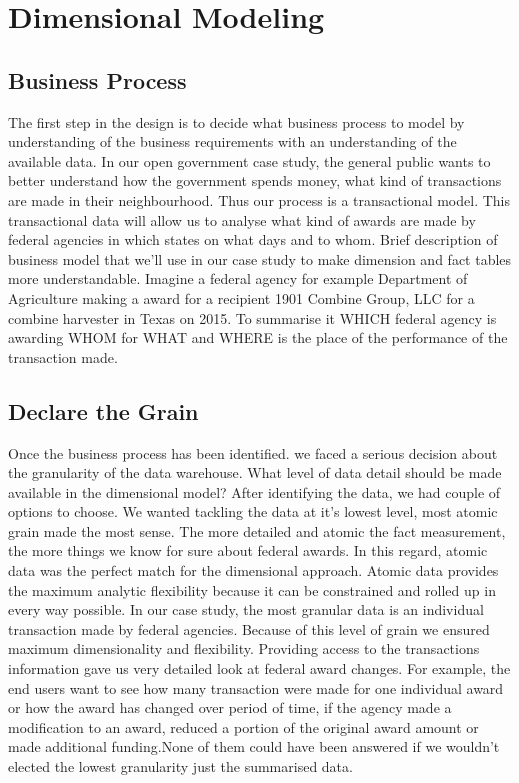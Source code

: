 \documentclass[letterpaper,12pt,oneside]{sphinxmanual}
\begin{document}
\section{Dimensional Modeling}
\label{datawarehouse:dimensional-modeling}

\subsection{Business Process}
\label{datawarehouse:business-process}
The first step in the design is to decide what business process to model by understanding of
the business requirements with an understanding of the available data. In our open government case study,
the general public wants to better understand how the government spends money, what kind of transactions are
made in their neighbourhood. Thus our process is a transactional model. This transactional data will allow us
to analyse what kind of awards are made by federal agencies in which states on what days and to whom.
Brief description of business model that we’ll use in our case study to make dimension and fact tables
more understandable. Imagine a federal agency for example Department of Agriculture making a award for a
recipient 1901 Combine Group, LLC for a combine harvester in Texas on 2015. To summarise it WHICH federal
agency is awarding WHOM for WHAT and WHERE is the place of the performance of the transaction made.


\subsection{Declare the Grain}
\label{datawarehouse:declare-the-grain}
Once the business process has been identified. we faced a serious decision about the granularity of the data warehouse.
What level of data detail should be made available in the dimensional model?
After identifying the data, we had couple of options to choose. We wanted tackling the data at it’s lowest level,
most atomic grain made the most sense. The more detailed and atomic the fact measurement, the more things we know for
sure about federal awards. In this regard, atomic data was the perfect match for the dimensional approach.
Atomic data provides the maximum analytic flexibility because it can be constrained and rolled up in every way possible.
In our case study, the most granular data is an individual transaction made by federal agencies. Because of this level of
grain we ensured maximum dimensionality and flexibility. Providing access to the transactions information gave us very
detailed look at federal award changes. For example, the end users want to see how many transaction were made for one
individual award or how the award has changed over period of time, if the agency made a modification to an award,
reduced a portion of the original award amount or made additional funding.None of them could have been answered if we wouldn't
elected the lowest granularity just the summarised data.
\end{document}
